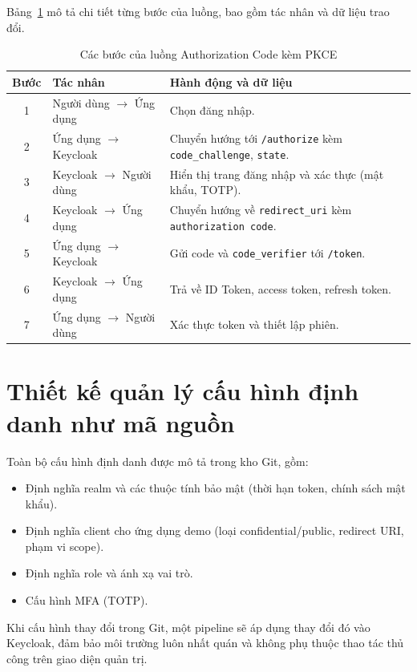 Bảng~\ref{tab:oidcflow} mô tả chi tiết từng bước của luồng, bao gồm tác nhân
và dữ liệu trao đổi.

\begin{table}[htbp]
\centering
\caption{Các bước của luồng Authorization Code kèm PKCE}
\label{tab:oidcflow}
\small
\begin{tabular}{c p{2.8cm} p{9.4cm}}
\toprule
\textbf{Bước} & \textbf{Tác nhân} & \textbf{Hành động và dữ liệu}\\
\midrule
1 & Người dùng $\rightarrow$ Ứng dụng & Chọn đăng nhập.\\
2 & Ứng dụng $\rightarrow$ Keycloak & Chuyển hướng tới \texttt{/authorize} kèm \texttt{code\_challenge}, \texttt{state}.\\
3 & Keycloak $\rightarrow$ Người dùng & Hiển thị trang đăng nhập và xác thực (mật khẩu, TOTP).\\
4 & Keycloak $\rightarrow$ Ứng dụng & Chuyển hướng về \texttt{redirect\_uri} kèm \texttt{authorization code}.\\
5 & Ứng dụng $\rightarrow$ Keycloak & Gửi code và \texttt{code\_verifier} tới \texttt{/token}.\\
6 & Keycloak $\rightarrow$ Ứng dụng & Trả về ID Token, access token, refresh token.\\
7 & Ứng dụng $\rightarrow$ Người dùng & Xác thực token và thiết lập phiên.\\
\bottomrule
\end{tabular}
\end{table}

\section{Thiết kế quản lý cấu hình định danh như mã nguồn}
\label{sec:cfgascode}

Toàn bộ cấu hình định danh được mô tả trong kho Git, gồm:
\begin{itemize}
  \item Định nghĩa realm và các thuộc tính bảo mật (thời hạn token,
  chính sách mật khẩu).
  \item Định nghĩa client cho ứng dụng demo (loại confidential/public,
  redirect URI, phạm vi scope).
  \item Định nghĩa role và ánh xạ vai trò.
  \item Cấu hình MFA (TOTP).
\end{itemize}

Khi cấu hình thay đổi trong Git, một pipeline sẽ áp dụng thay đổi đó vào
Keycloak, đảm bảo môi trường luôn nhất quán và không phụ thuộc thao tác thủ
công trên giao diện quản trị.


